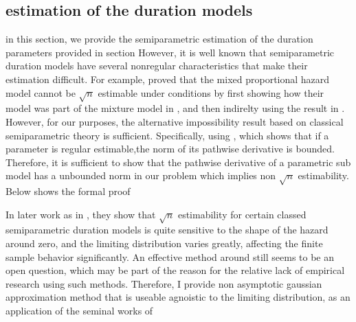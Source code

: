 \documentclass{article}
\begin{document}
 \subsection{ estimation of the duration models } 
     in this section, we provide the semiparametric estimation of the duration parameters provided in  section \todo
     However, it is well known that semiparametric duration models have several nonregular characteristics that make their estimation difficult. For example, \cite{hahn 1994} proved that the mixed proportional hazard model cannot be $ \sqrt {n} $ estimable under conditions by first showing how their model was part of the mixture model in \cite{chamberlain 1986} , and then indirelty using the result in\cite{ Pfanzagl  2000} . 
     However, for our purposes, the alternative impossibility result based on classical semiparametric theory is sufficient. Specifically, using \cite{van der vaart 1991}, which shows that if a parameter is regular estimable,the norm of its pathwise derivative is bounded. Therefore, it is sufficient to show that the pathwise derivative of a parametric sub model has a unbounded norm in our problem which implies non $\sqrt{n} $ estimability. Below shows the formal proof \todo
     
     In later work as in \cite{ridder and weid 2003} , they show that $\sqrt{n} $ estimability for certain classed semiparametric duration models is quite sensitive to the shape of the hazard around zero, and the limiting distribution varies greatly, affecting the finite sample behavior significantly. An effective method around still seems to be an open question, which may be part of the reason for the relative lack of empirical research using such methods. Therefore, I provide non asymptotic gaussian approximation method that is useable agnoistic to the limiting distribution, as an application of the seminal works of \cite{chernozhukov , 2012}
     
     
     




\end{document}
